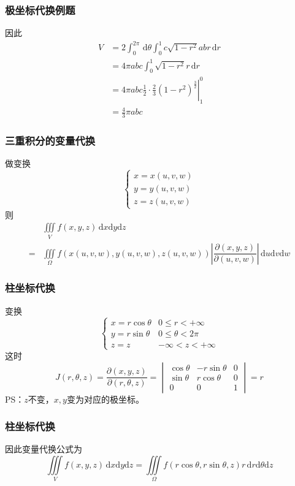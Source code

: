 \documentclass[xetex]{beamer}
\begin{document}
\begin{frame}
    \frametitle{极坐标代换例题}
    因此
    \begin{align*}
    V &= 2\int _0 ^{2 \pi} \,\mathrm{d} \theta \int _0^1 c \sqrt{1 - r^2} abr\,\mathrm{d}r \\
      &=4 \pi abc \int _0 ^1 \sqrt{1 - r^2} r\,\mathrm{d}r \\
      &= \left. 4 \pi abc \frac{1}{2} \cdot \frac{2}{3} (1 - r^2) ^{\frac{3}{2}} \right| _1 ^0 \\
      &= \frac{4}{3} \pi abc
     \end{align*}
\end{frame} 

\begin{frame}
    \frametitle{三重积分的变量代换}
    做变换
    $$\begin{cases}
         x=x(u,v,w) \\
         y=y(u,v,w) \\
           z=z(u,v,w)
    \end{cases} $$   
    则
    \begin{align*}
    &\iiint\limits_V f(x,y,z) \,\mathrm{d}x\mathrm{d}y\mathrm{d}z \\
    = &\iiint\limits_\Omega f(x(u,v,w), y(u,v,w), z(u,v,w)) \left| \dfrac{\partial (x,y,z)}{\partial (u,v,w)} \right|\,\mathrm{d}u\mathrm{d}v\mathrm{d}w
    \end{align*}
\end{frame} 

\begin{frame}
    \frametitle{柱坐标代换}
    变换
    $$\begin{cases}
        x=r \cos{\theta} & 0 \leq r < + \infty \\
        y=r \sin{\theta} & 0 \leq  \theta < 2 \pi \\
        z=z & - \infty < z < + \infty
    \end{cases}$$
    这时
    $$J(r , \theta , z) = \dfrac{\partial (x,y,z)}{\partial (r, \theta ,z)} = 
    \begin{vmatrix}
        \cos{\theta} & -r\sin{\theta} & 0 \\
        \sin{\theta} & r\cos{\theta} & 0 \\
        0  & 0 & 1
    \end{vmatrix} = r$$
    PS：$z$不变，$x,y$变为对应的极坐标。
\end{frame} 

\begin{frame}
    \frametitle{柱坐标代换}
    因此变量代换公式为
    $$\iiint \limits_V f(x,y,z) \,\mathrm{d}x\mathrm{d}y\mathrm{d}z =  \iiint \limits_{\Omega} f(r \cos{\theta} , r \sin{\theta} , z) r\,\mathrm{d}r\mathrm{d} \theta \mathrm{d}z$$
\end{frame} 
\end{document}
